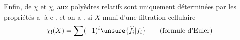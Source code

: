 Enfin,  de  $\chi$ et $\chi_!$ aux polyèdres relatifs sont uniquement déterminées par les propriétés \textcircled{a} à \textcircled{e}, et on a , si $X$ muni d'une filtration cellulaire
\[
\chi_!(X)=\sum(-1)^i\unsure{\widehat f_i|f_i}\qquad\text{(formule d'Euler)}
\]

